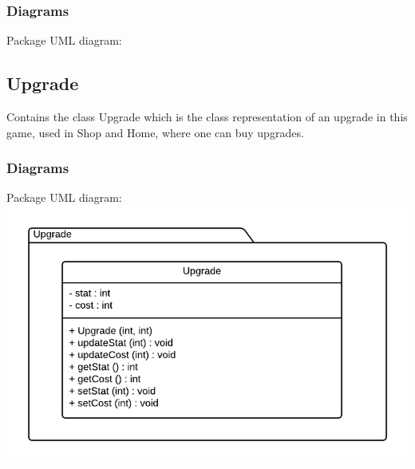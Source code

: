 \documentclass{article}
\begin{document}
\subsubsection{Diagrams}
    Package UML diagram:\\

\subsection{Upgrade}
Contains the class Upgrade which is the class representation of an upgrade in this game, used in Shop and Home, where one can buy upgrades.

\subsubsection{Diagrams}
\begin{center}
    Package UML diagram:
    \includegraphics[scale=0.5]{uml/upgradeUml.png}
\end{center}
\end{document}

